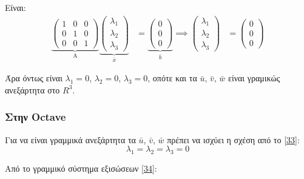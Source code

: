 \documentclass[12pt, fleqn, leqno]{extreport}
\begin{document}
Είναι:
\begin{equation*}
    \begin{aligned}
        \underbrace{
            \begin{pmatrix}
                1 & 0 & 0 \\
                0 & 1 & 0 \\
                0 & 0 & 1
            \end{pmatrix}}_\text{A}
        \underbrace{
        \begin{pmatrix}
                \lambda_{1} \\
                \lambda_{2} \\
                \lambda_{3}
            \end{pmatrix}}_\text{$\bar{x}$} & =
        \underbrace{
            \begin{pmatrix}
                0 \\
                0 \\
                0
            \end{pmatrix}}_\text{$\bar{b}$}
        \implies
        \begin{pmatrix}
            \lambda_{1} \\
            \lambda_{2} \\
            \lambda_{3}
        \end{pmatrix}                   & =
        \begin{pmatrix}
            0 \\
            0 \\
            0
        \end{pmatrix}
    \end{aligned}
\end{equation*}

Άρα όντως είναι $\lambda_{1}=0$, $\lambda_{2}=0$, $\lambda_{3}=0$, οπότε και τα $\bar{u}$, $\bar{v}$, $\bar{w}$ είναι γραμικώς ανεξάρτητα στο $R^{3}$.

\subsubsection{Στην Octave}

Για να είναι γραμμικά ανεξάρτητα τα $\bar{u}$, $\bar{v}$, $\bar{w}$ πρέπει να ισχύει η σχέση από το \eqref{33}:
\begin{equation*}
    \lambda_{1} = \lambda_{2} = \lambda_{3} = 0
\end{equation*}

Από το γραμμικό σύστημα εξισώσεων \eqref{34}:
\end{document}
